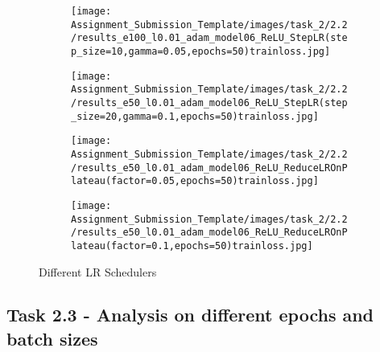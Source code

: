 \documentclass{article} %
\begin{document}
\begin{figure}[h!]
	\centering
	\begin{subfigure}{0.25\linewidth}
		\texttt{[image: Assignment\_Submission\_Template/images/task\_2/2.2/results\_e100\_l0.01\_adam\_model06\_ReLU\_StepLR(step\_size=10,gamma=0.05,epochs=50)trainloss.jpg]}
	    \caption{}
		\label{fig:StepLR(step_size=10,gamma=0.05)}
	\end{subfigure}	
        \begin{subfigure}{0.25\linewidth}
		\texttt{[image: Assignment\_Submission\_Template/images/task\_2/2.2/results\_e50\_l0.01\_adam\_model06\_ReLU\_StepLR(step\_size=20,gamma=0.1,epochs=50)trainloss.jpg]}
		\caption{}
		\label{fig:StepLR(step_size=20,gamma=0.1)}
	\end{subfigure}	
	\begin{subfigure}{0.25\linewidth}
	        \texttt{[image: Assignment\_Submission\_Template/images/task\_2/2.2/results\_e50\_l0.01\_adam\_model06\_ReLU\_ReduceLROnPlateau(factor=0.05,epochs=50)trainloss.jpg]}
	        \caption{}
	        \label{fig:ReduceLROnPlateau(factor=0.05)}
         \end{subfigure}
         \begin{subfigure}{0.25\linewidth}
	        \texttt{[image: Assignment\_Submission\_Template/images/task\_2/2.2/results\_e50\_l0.01\_adam\_model06\_ReLU\_ReduceLROnPlateau(factor=0.1,epochs=50)trainloss.jpg]}
	        \caption{}
	        \label{fig:ReduceLROnPlateau(factor=0.1)}
         \end{subfigure}
	\caption{Different LR Schedulers}
	\label{fig:subfigures}
\end{figure}


\subsection*{Task 2.3 - Analysis on different epochs and batch sizes}
\end{document}
